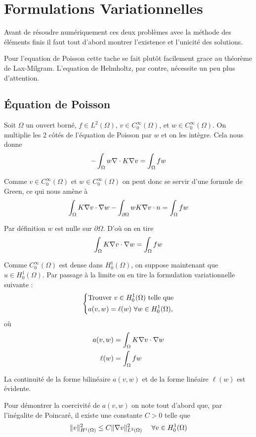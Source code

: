 \section{Formulations Variationnelles}

Avant de résoudre numériquement ces deux problèmes avec la méthode des
éléments finis il faut tout d'abord montrer l'existence et l'unicité des solutions.

Pour l'equation de Poisson cette tache se fait plutôt facilement grace au théorème
de Lax-Milgram. L'equation de Helmholtz, par contre, nécessite un peu plus
d'attention.


\subsection{Équation de Poisson}

Soit $\Omega$ un ouvert borné, $f \in L^2(\Omega)$, $v \in C_0^\infty(\Omega)$,
et $w \in C_0^\infty(\Omega)$. On multiplie les 2 côtés de l'équation de Poisson
par $w$ et on les intègre. Cela nous donne
\[
    -\int_\Omega w \nabla \cdot K \nabla v = \int_\Omega fw
\]

Comme $v \in C_0^\infty(\Omega)$ et $w \in C_0^\infty(\Omega)$ on peut donc se
servir d'une formule de Green, ce qui nous amène à
\[
    \int_\Omega K \nabla v \cdot \nabla w
    - \int_{\partial \Omega} w K \nabla v \cdot n = \int_\Omega fw
\]

Par définition $w$ est nulle sur $\partial \Omega$. D'où on en tire
\[
    \int_\Omega K \nabla v \cdot \nabla w = \int_\Omega fw
\]

Comme $C_0^\infty(\Omega)$ est dense dans $H_0^1(\Omega)$, on suppose maintenant
que $u \in H_0^1(\Omega)$. Par passage à la limite on en tire la formulation
variationnelle suivante :
\[\begin{dcases}
    \text{Trouver } v \in H_0^1(\Omega) \text{ telle que} \\
    a(v, w) = \ell(w) \forall w \in H_0^1(\Omega),
\end{dcases}\]
%
où
\begin{align}
    a(v, w) &= \int_\Omega K \nabla v \cdot \nabla w \\
    \ell(w) &= \int_\Omega fw
\end{align}

La continuité de la forme bilinéaire $a(v, w)$ et de la forme linéaire
$\ell(w)$ est évidente.

Pour démontrer la coercivité de $a(v, w)$ on note tout d'abord que, par l'inégalite
de Poincaré, il existe une constante $C > 0$ telle que
\begin{align}
    \norme{v}^2_{H^1(\Omega)} \le C \norme{\nabla v}^2_{L^2(\Omega)}
    \quad \forall v \in H_0^1(\Omega)
\end{align}

